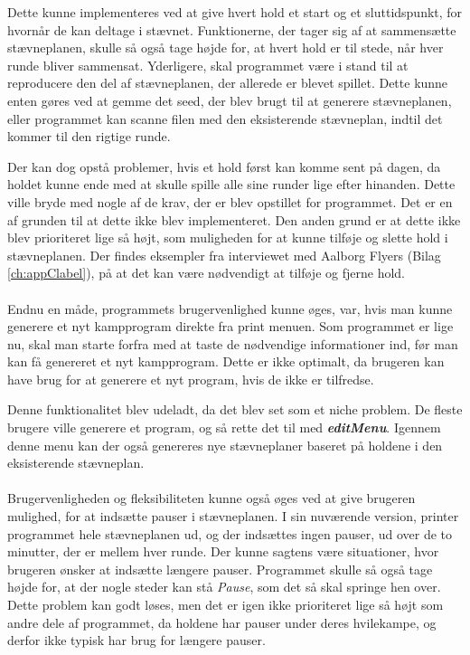 \par 
Dette kunne implementeres ved at give hvert hold et start og et sluttidspunkt, for hvornår de kan deltage i stævnet. Funktionerne, der tager sig af at sammensætte stævneplanen, skulle så også tage højde for, at hvert hold er til stede, når hver runde bliver sammensat. Yderligere, skal programmet være i stand til at reproducere den del af stævneplanen, der allerede er blevet spillet. Dette kunne enten gøres ved at gemme det seed, der blev brugt til at generere stævneplanen, eller programmet kan scanne filen med den eksisterende stævneplan, indtil det kommer til den rigtige runde.
\par
Der kan dog opstå problemer, hvis et hold først kan komme sent på dagen, da holdet kunne ende med at skulle spille alle sine runder lige efter hinanden. Dette ville bryde med nogle af de krav, der er blev opstillet for programmet. Det er en af grunden til at dette ikke blev implementeret. Den anden grund er at dette ikke blev prioriteret lige så højt, som muligheden for at kunne tilføje og slette hold i stævneplanen. Der findes eksempler fra interviewet med Aalborg Flyers (Bilag \ref{ch:appClabel}), på at det kan være nødvendigt at tilføje og fjerne hold.
\\\\
Endnu en måde, programmets brugervenlighed kunne øges, var, hvis man kunne generere et nyt kampprogram direkte fra print menuen. Som programmet er lige nu, skal man starte forfra med at taste de nødvendige informationer ind, før man kan få genereret et nyt kampprogram. Dette er ikke optimalt, da brugeren kan have brug for at generere et nyt program, hvis de ikke er tilfredse. 
\par
Denne funktionalitet blev udeladt, da det blev set som et niche problem. De fleste brugere ville generere et program, og så rette det til med \textbf{\textit{editMenu}}. Igennem denne menu kan der også genereres nye stævneplaner baseret på holdene i den eksisterende stævneplan.
\\\\
Brugervenligheden og fleksibiliteten kunne også øges ved at give brugeren mulighed, for at indsætte pauser i stævneplanen. I sin nuværende version, printer programmet hele stævneplanen ud, og der indsættes ingen pauser, ud over de to minutter, der er mellem hver runde. Der kunne sagtens være situationer, hvor brugeren ønsker at indsætte længere pauser. Programmet skulle så også tage højde for, at der nogle steder kan stå \textit{Pause}, som det så skal springe hen over. Dette problem kan godt løses, men det er igen ikke prioriteret lige så højt som andre dele af programmet, da holdene har pauser under deres hvilekampe, og derfor ikke typisk har brug for længere pauser. 
